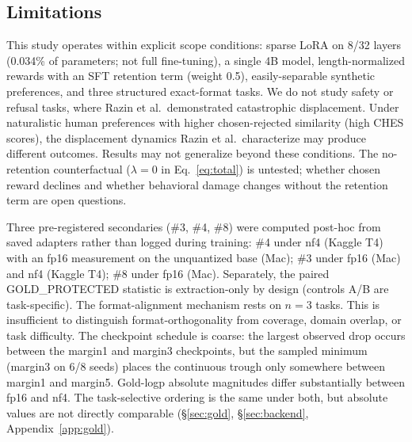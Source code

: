 \documentclass{article}
\begin{document}
\subsection{Limitations}
\label{sec:limits}
This study operates within explicit scope conditions: sparse LoRA on 8/32 layers (0.034\% of parameters; not full fine-tuning), a single 4B model, length-normalized rewards with an SFT retention term (weight 0.5), easily-separable synthetic preferences, and three structured exact-format tasks. We do not study safety or refusal tasks, where Razin et al.\ demonstrated catastrophic displacement. Under naturalistic human preferences with higher chosen-rejected similarity (high CHES scores), the displacement dynamics Razin et al.\ characterize may produce different outcomes. Results may not generalize beyond these conditions. The no-retention counterfactual ($\lambda = 0$ in Eq.~\eqref{eq:total}) is untested; whether chosen reward declines and whether behavioral damage changes without the retention term are open questions.

Three pre-registered secondaries (\#3, \#4, \#8) were computed post-hoc from saved adapters rather than logged during training: \#4 under nf4 (Kaggle T4) with an fp16 measurement on the unquantized base (Mac); \#3 under fp16 (Mac) and nf4 (Kaggle T4); \#8 under fp16 (Mac). Separately, the paired GOLD\_PROTECTED statistic is extraction-only by design (controls A/B are task-specific). The format-alignment mechanism rests on $n = 3$ tasks. This is insufficient to distinguish format-orthogonality from coverage, domain overlap, or task difficulty. The checkpoint schedule is coarse: the largest observed drop occurs between the margin1 and margin3 checkpoints, but the sampled minimum (margin3 on 6/8 seeds) places the continuous trough only somewhere between margin1 and margin5. Gold-logp absolute magnitudes differ substantially between fp16 and nf4. The task-selective ordering is the same under both, but absolute values are not directly comparable (\S\ref{sec:gold}, \S\ref{sec:backend}, Appendix~\ref{app:gold}).
\end{document}
